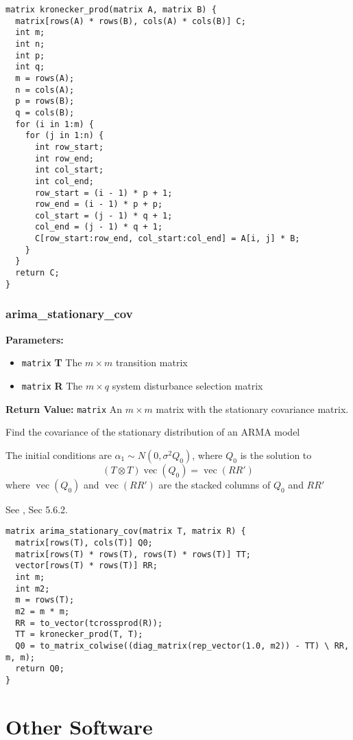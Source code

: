 \documentclass[]{book}
\providecommand{\tightlist}{%
  \setlength{\itemsep}{0pt}\setlength{\parskip}{0pt}}
\DeclareMathOperator{\VEC}{vec}
\begin{document}
\begin{verbatim}
matrix kronecker_prod(matrix A, matrix B) {
  matrix[rows(A) * rows(B), cols(A) * cols(B)] C;
  int m;
  int n;
  int p;
  int q;
  m = rows(A);
  n = cols(A);
  p = rows(B);
  q = cols(B);
  for (i in 1:m) {
    for (j in 1:n) {
      int row_start;
      int row_end;
      int col_start;
      int col_end;
      row_start = (i - 1) * p + 1;
      row_end = (i - 1) * p + p;
      col_start = (j - 1) * q + 1;
      col_end = (j - 1) * q + 1;
      C[row_start:row_end, col_start:col_end] = A[i, j] * B;
    }
  }
  return C;
}
\end{verbatim}

\subsection{arima\_stationary\_cov}\label{arimaux5fstationaryux5fcov}

\textbf{Parameters:}

\begin{itemize}
\tightlist
\item
  \texttt{matrix} \textbf{T} The \(m \times m\) transition matrix
\item
  \texttt{matrix} \textbf{R} The \(m \times q\) system disturbance
  selection matrix
\end{itemize}

\textbf{Return Value:} \texttt{matrix} An \(m \times m\) matrix with the
stationary covariance matrix.

Find the covariance of the stationary distribution of an ARMA model

The initial conditions are \(\alpha_1 \sim N(0, \sigma^2 Q_0)\), where
\(Q_0\) is the solution to \[
(T \otimes T) \VEC(Q_0) = \VEC(R R')
\] where \(\VEC(Q_0)\) and \(\VEC(R R')\) are the stacked columns of
\(Q_0\) and \(R R'\)

See \textcite{DurbinKoopman2012}, Sec 5.6.2.

\begin{verbatim}
matrix arima_stationary_cov(matrix T, matrix R) {
  matrix[rows(T), cols(T)] Q0;
  matrix[rows(T) * rows(T), rows(T) * rows(T)] TT;
  vector[rows(T) * rows(T)] RR;
  int m;
  int m2;
  m = rows(T);
  m2 = m * m;
  RR = to_vector(tcrossprod(R));
  TT = kronecker_prod(T, T);
  Q0 = to_matrix_colwise((diag_matrix(rep_vector(1.0, m2)) - TT) \ RR, m, m);
  return Q0;
}
\end{verbatim}

\chapter{Other Software}\label{other-software}
\end{document}
